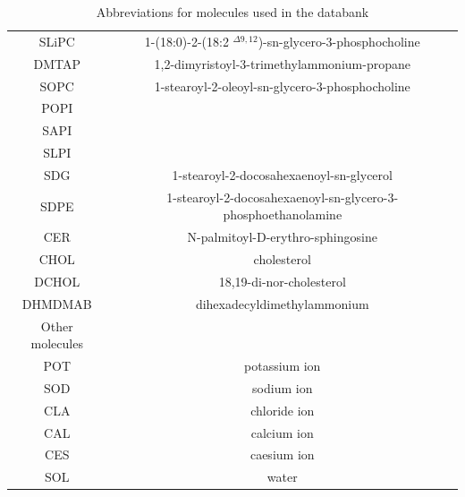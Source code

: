 \documentclass[fleqn,10pt]{wlscirep}
\begin{document}
\begin{table}[p]
\begin{tabular}{c c}
    SLiPC & 1-(18:0)-2-(18:2 $^{\Delta9,12}$)-sn-glycero-3-phosphocholine  \\
    DMTAP & 1,2-dimyristoyl-3-trimethylammonium-propane \\
    SOPC & 1-stearoyl-2-oleoyl-sn-glycero-3-phosphocholine \\
    POPI & \\ 
    SAPI & \\
    SLPI &  \\
    SDG & 1-stearoyl-2-docosahexaenoyl-sn-glycerol \\
    SDPE & 1-stearoyl-2-docosahexaenoyl-sn-glycero-3-phosphoethanolamine \\
    CER  & N-palmitoyl-D-erythro-sphingosine \\
    CHOL & cholesterol  \\
    DCHOL & 18,19-di-nor-cholesterol \\
    DHMDMAB & dihexadecyldimethylammonium  \\
    \hline
    Other molecules & \\
    \hline
    POT & potassium ion  \\
    SOD & sodium ion  \\
    CLA & chloride ion \\
    CAL & calcium ion  \\
    CES & caesium ion \\
    SOL & water  \\
    \end{tabular}
    \caption{Abbreviations for molecules used in the databank}
    \label{tab:abbreviations}
\end{table}
\end{document}
